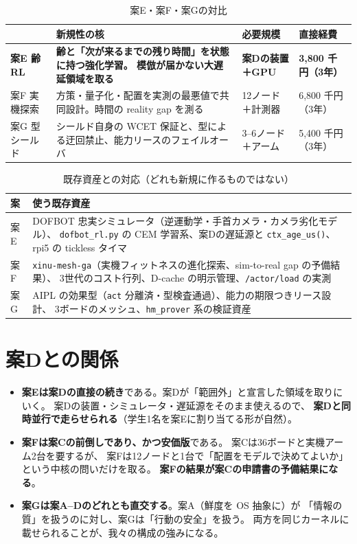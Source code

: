 \documentclass[11pt,a4paper]{article}
\newcommand{\code}[1]{\texttt{#1}}
\newcommand{\keyp}[1]{\textbf{\textcolor{blue!45!black}{#1}}}
\begin{document}
\begin{table}[htbp]
\centering
\small
\caption{案E・案F・案Gの対比}
\begin{tabularx}{\textwidth}{@{}l X l l@{}}
\toprule
 & \textbf{新規性の核} & \textbf{必要規模} & \textbf{直接経費} \\
\midrule
\textbf{案E 齢 RL} & \textbf{齢と「次が来るまでの残り時間」を状態に持つ強化学習。
  模倣が届かない大遅延領域を取る} & \textbf{案Dの装置＋GPU} & \textbf{3,800 千円（3年）} \\
案F 実機探索 & 方策・量子化・配置を実測の最悪値で共同設計。時間の reality gap を測る &
  12ノード＋計測器 & 6,800 千円（3年） \\
案G 型シールド & シールド自身の WCET 保証と、型による迂回禁止、能力リースのフェイルオーバ &
  3--6ノード＋アーム & 5,400 千円（3年） \\
\bottomrule
\end{tabularx}
\end{table}

\begin{table}[htbp]
\centering
\small
\caption{既存資産との対応（どれも新規に作るものではない）}
\begin{tabularx}{\textwidth}{@{}l X@{}}
\toprule
\textbf{案} & \textbf{使う既存資産} \\
\midrule
案E & DOFBOT 忠実シミュレータ（逆運動学・手首カメラ・カメラ劣化モデル）、
  \code{dofbot\_rl.py} の CEM 学習系、案Dの遅延源と \code{ctx\_age\_us()}、
  rpi5 の tickless タイマ \\
案F & \code{xinu-mesh-ga}（実機フィットネスの進化探索、sim-to-real gap の予備結果）、
  3世代のコスト行列、D-cache の明示管理、\code{/actor/load} の実測 \\
案G & AIPL の効果型（\code{act} 分離済・型検査通過）、能力の期限つきリース設計、
  3ボードのメッシュ、\code{hm\_prover} 系の検証資産 \\
\bottomrule
\end{tabularx}
\end{table}

\section{案Dとの関係}

\begin{itemize}[leftmargin=1.4em,itemsep=3pt]
  \item \keyp{案Eは案Dの直接の続き}である。案Dが「範囲外」と宣言した領域を取りにいく。
        案Dの装置・シミュレータ・遅延源をそのまま使えるので、
        \keyp{案Dと同時並行で走らせられる}（学生1名を案Eに割り当てる形が自然）。
  \item \keyp{案Fは案Cの前倒しであり、かつ安価版}である。
        案Cは36ボードと実機アーム2台を要するが、
        案Fは12ノードと1台で「配置をモデルで決めてよいか」という中核の問いだけを取る。
        \keyp{案Fの結果が案Cの申請書の予備結果になる}。
  \item \keyp{案Gは案A--Dのどれとも直交する}。案A（鮮度を OS 抽象に）が
        「情報の質」を扱うのに対し、案Gは「行動の安全」を扱う。
        両方を同じカーネルに載せられることが、我々の構成の強みになる。
\end{itemize}
\end{document}
